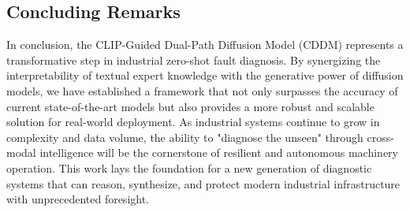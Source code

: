 \subsection{Concluding Remarks}
In conclusion, the CLIP-Guided Dual-Path Diffusion Model (CDDM) represents a transformative step in industrial zero-shot fault diagnosis. By synergizing the interpretability of textual expert knowledge with the generative power of diffusion models, we have established a framework that not only surpasses the accuracy of current state-of-the-art models but also provides a more robust and scalable solution for real-world deployment. As industrial systems continue to grow in complexity and data volume, the ability to "diagnose the unseen" through cross-modal intelligence will be the cornerstone of resilient and autonomous machinery operation. This work lays the foundation for a new generation of diagnostic systems that can reason, synthesize, and protect modern industrial infrastructure with unprecedented foresight.

\cite{lee2014prognostics, wang2020deep, precup2015overview, tzeng2017adversarial, song2021denoising}
